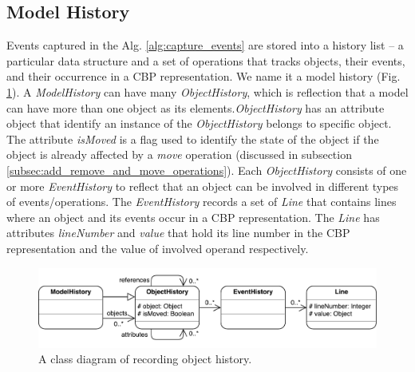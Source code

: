 \documentclass{llncs}
\begin{document}
\subsection{Model History}
\label{sec:model_history}
Events captured in the Alg. \ref{alg:capture_events} are stored into a  history list -- a particular data structure and a set of operations that tracks objects, their events, and their  occurrence in a CBP representation. We name it a model history (Fig. \ref{fig:object_history}). A \emph{ModelHistory} can have many \emph{ObjectHistory}, which is reflection that a model can have more than one object as its elements.\emph{ObjectHistory} has an attribute object that identify an instance of the \emph{ObjectHistory} belongs to specific object. The attribute \emph{isMoved} is a flag used to identify the state of the object if the object is already affected by a \emph{move} operation (discussed in subsection \ref{subsec:add_remove_and_move_operations}). Each \emph{ObjectHistory} consists of one or more \emph{EventHistory} to reflect that an object can be involved in different types of events/operations. The \emph{EventHistory} records a set of \emph{Line} that contains lines where an object and its events occur in a CBP representation. The \emph{Line} has attributes \emph{lineNumber} and \emph{value} that hold its line number in the CBP representation and the value of involved operand respectively.

\begin{figure}[ht]
\centering
\includegraphics[width=\linewidth]{object_history}
\caption{A class diagram of recording object history.}
\label{fig:object_history}
\end{figure}
\end{document}
